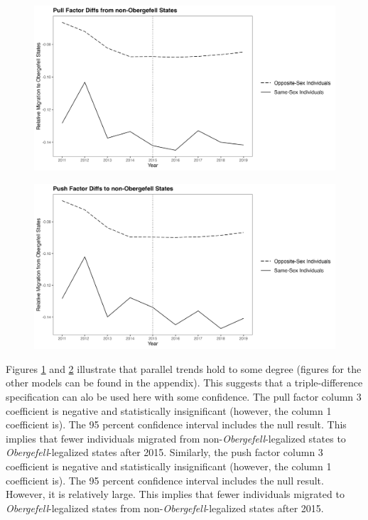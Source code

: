 \documentclass[12pt,letterpaper]{article}
\begin{document}
\begin{figure}[htbp]
    \centering
    \includegraphics[width=1\linewidth]{outputs/summary_stats/flows_post_diffs.png}
    \caption{}
    \label{fig: flows_post_diffs}
\end{figure}
\begin{figure}[htbp]
    \centering
    \includegraphics[width=1\linewidth]{outputs/summary_stats/flows_ante_diffs.png}
    \caption{}
    \label{fig: flows_ante_diffs}
\end{figure}

Figures \ref{fig: flows_post_diffs} and \ref{fig: flows_ante_diffs} illustrate that parallel trends hold to some degree (figures for the other models can be found in the appendix). This suggests that a triple-difference specification can alo be used here with some confidence. The pull factor column 3 coefficient is negative and statistically insignificant (however, the column 1 coefficient is). The 95 percent confidence interval includes the null result. This implies that fewer individuals migrated from non-\textit{Obergefell}-legalized states to \textit{Obergefell}-legalized states after 2015.  Similarly, the push factor column 3 coefficient is negative and statistically insignificant (however, the column 1 coefficient is). The 95 percent confidence interval includes the null result. However, it is relatively large. This implies that fewer individuals migrated to \textit{Obergefell}-legalized states from non-\textit{Obergefell}-legalized states after 2015. 
\end{document}
